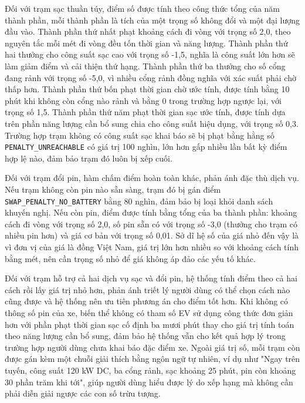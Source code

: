 \documentclass[../Main.tex]{subfiles}
\begin{document}
Đối với trạm sạc thuần túy, điểm số được tính theo công thức tổng của năm thành phần, mỗi thành phần là tích của một trọng số không đổi và một đại lượng đầu vào. Thành phần thứ nhất phạt khoảng cách đi vòng với trọng số 2,0, theo nguyên tắc mỗi mét đi vòng đều tốn thời gian và năng lượng. Thành phần thứ hai thưởng cho công suất sạc cao với trọng số -1,5, nghĩa là công suất lớn hơn sẽ làm giảm điểm và cải thiện thứ hạng. Thành phần thứ ba thưởng cho số cổng đang rảnh với trọng số -5,0, vì nhiều cổng rảnh đồng nghĩa với xác suất phải chờ thấp hơn. Thành phần thứ bốn phạt thời gian chờ ước tính, được tính bằng 10 phút khi không còn cổng nào rảnh và bằng 0 trong trường hợp ngược lại, với trọng số 1,5. Thành phần thứ năm phạt thời gian sạc ước tính, được tính dựa trên phần năng lượng cần bổ sung chia cho công suất hiệu dụng, với trọng số 0,3. Trường hợp trạm không có công suất sạc khai báo sẽ bị phạt bằng hằng số \texttt{PENALTY\_UNREACHABLE} có giá trị 100 nghìn, lớn hơn gấp nhiều lần bất kỳ điểm hợp lệ nào, đảm bảo trạm đó luôn bị xếp cuối.

Đối với trạm đổi pin, hàm chấm điểm hoàn toàn khác, phản ánh đặc thù dịch vụ. Nếu trạm không còn pin nào sẵn sàng, trạm đó bị gán điểm \texttt{SWAP\_PENALTY\_NO\_BATTERY} bằng 80 nghìn, đảm bảo bị loại khỏi danh sách khuyến nghị. Nếu còn pin, điểm được tính bằng tổng của ba thành phần: khoảng cách đi vòng với trọng số 2,0, số pin sẵn có với trọng số -3,0 (thưởng cho trạm có nhiều pin hơn) và giá cơ bản với trọng số 0,01. Sở dĩ hệ số của giá nhỏ đến vậy là vì đơn vị của giá là đồng Việt Nam, giá trị lớn hơn nhiều so với khoảng cách tính bằng mét, nên cần trọng số nhỏ để giá không áp đảo các yếu tố khác.

Đối với trạm hỗ trợ cả hai dịch vụ sạc và đổi pin, hệ thống tính điểm theo cả hai cách rồi lấy giá trị nhỏ hơn, phản ánh triết lý người dùng có thể chọn cách nào cũng được và hệ thống nên ưu tiên phương án cho điểm tốt hơn. Khi không có thông số pin của xe, biến thể không có tham số EV sử dụng công thức đơn giản hơn với phần phạt thời gian sạc cố định ba mươi phút thay cho giá trị tính toán theo năng lượng cần bổ sung, đảm bảo hệ thống vẫn cho kết quả hợp lý trong trường hợp người dùng chưa khai báo đặc điểm xe. Ngoài giá trị số, mỗi trạm còn được gán kèm một chuỗi giải thích bằng ngôn ngữ tự nhiên, ví dụ như "Ngay trên tuyến, công suất 120 kW DC, ba cổng rảnh, sạc khoảng 25 phút, pin còn khoảng 30 phần trăm khi tới", giúp người dùng hiểu được lý do xếp hạng mà không cần phải diễn giải ngược các con số trừu tượng.
\end{document}
